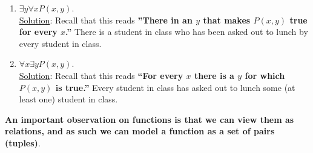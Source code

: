 \documentclass[12pt]{article}
\begin{document}
\begin{enumerate}
\begin{enumerate}
\item $\exists y \forall x P(x, y)$.\\

\noindent \underline{Solution}: Recall that this reads \textbf{''There in an $y$ that makes $P(x, y)$ true for every $x$.''} There is a student in class who has been asked out to lunch by every student in class.\\

\item $\forall x \exists y P(x, y)$.\\

\noindent \underline{Solution}: Recall that this reads \textbf{``For every $x$ there is a $y$ for which $P(x, y)$ is true.''} Every student in class has asked out to lunch some (at least one) student in class.
\end{enumerate}


\end{enumerate}





\noindent \textbf{An important observation on functions is that we can view them as relations, and as such we can model a function as a set of pairs (tuples)}.
\end{document}
